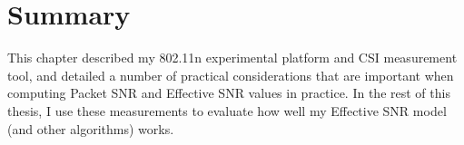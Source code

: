 \section{Summary}
This chapter described my 802.11n experimental platform and CSI measurement tool, and detailed a number of practical considerations that are important when computing Packet SNR and Effective SNR values in practice. In the rest of this thesis, I use these measurements to evaluate how well my Effective SNR model (and other algorithms) works.

\ifx\mainfile\undefined

\fi